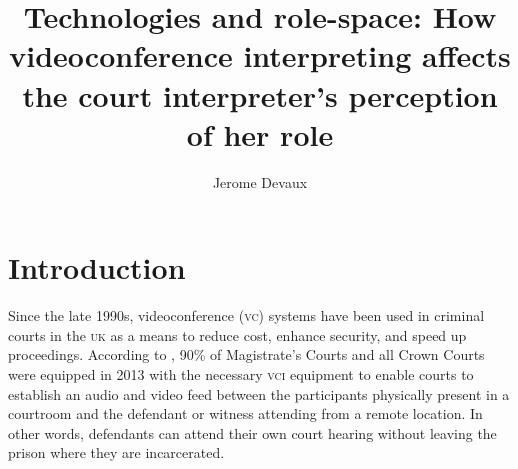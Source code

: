 \documentclass[output=paper]{langsci/langscibook}
\author{Jerome Devaux\affiliation{The Open University}}
\title{Technologies and role-space: How videoconference interpreting affects the court interpreter’s perception of her role}
\begin{document}

 

 

 

 

 

 

 

 

 

 

 

\section{Introduction}
\label{sec:devaux:1}
Since the late 1990s, videoconference (\textsc{vc}) systems have been used in criminal courts in the \textsc{uk} \citep{Plotnikoff1999, Plotnikoff2000} as a means to reduce cost, enhance security, and speed up proceedings. According to \citep{Braun2016b}, 90\% of Magistrate’s Courts and all Crown Courts were equipped in 2013 with the necessary \textsc{vci} equipment to enable courts to establish an audio and video feed between the participants physically present in a courtroom and the defendant or witness attending from a remote location. In other words, defendants can attend their own court hearing without leaving the prison where they are incarcerated. 
\end{document}
